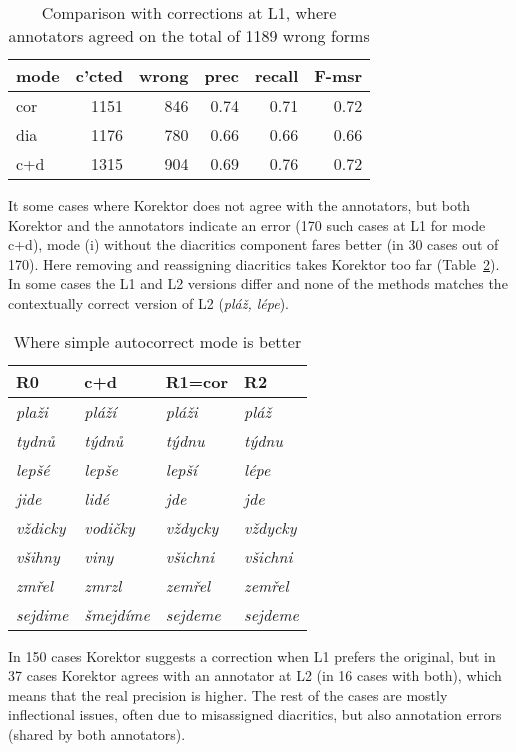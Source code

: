 \documentclass[11pt]{article}
\begin{document}
\begin{table}[h]
\centering
\begin{tabular}[htbp]{l|rrrrr}
mode & c'cted & wrong & prec & recall & F-msr \\ \hline
cor & 1151 & 846 & 0.74 & 0.71 & 0.72 \\
dia & 1176 & 780 & 0.66 & 0.66 & 0.66 \\
c+d & 1315 & 904 & 0.69 & 0.76 & 0.72
\end{tabular}
\caption{Comparison with corrections at L1, where annotators agreed on the
total of 1189 wrong forms}
\label{tab:l1}
\end{table}

It some cases where Korektor does not agree with the annotators, but
both Korektor and the annotators indicate an error (170 such cases at
L1 for mode c+d), mode (i) without the diacritics component fares
better (in 30 cases out of 170). Here removing and reassigning
diacritics takes Korektor too far (Table~\ref{tab:cor}). In
some cases the L1 and L2 versions differ and none of the methods
matches the contextually correct version of L2 (\emph{pláž, lépe}).
                        

\begin{table}[h]
\centering
\begin{tabular}[htbp]{l|l|l|l}
R0 & c+d & R1=cor & R2 \\ \hline
\emph{plaži} & \emph{pláží} & \emph{pláži} & \emph{pláž} \\
 \emph{tydnů} & \emph{týdnů} & \emph{týdnu} & \emph{týdnu} \\
 \emph{lepšé} & \emph{lepše} & \emph{lepší} & \emph{lépe} \\
 \emph{jide} & \emph{lidé} & \emph{jde} & \emph{jde} \\
 \emph{vždicky} & \emph{vodičky} & \emph{vždycky} & \emph{vždycky} \\
 \emph{všihny} & \emph{viny} & \emph{všichni} & \emph{všichni} \\
 \emph{zmřel} & \emph{zmrzl} & \emph{zemřel} & \emph{zemřel} \\
 \emph{sejdime} & \emph{šmejdíme} & \emph{sejdeme} & \emph{sejdeme}  
\end{tabular}
\caption{Where simple autocorrect mode is better}
\label{tab:cor}
\end{table}

In 150 cases Korektor suggests a correction when L1 prefers the
original, but in 37 cases Korektor agrees with an annotator at L2 (in
16 cases with both), which means that the real precision is higher. The rest of
the cases are mostly inflectional issues, often due to misassigned diacritics,
but also annotation errors (shared by both annotators). 
\end{document}
